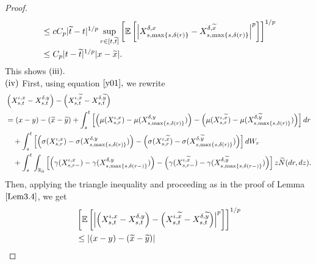 \documentclass[11pt]{article}
\theoremstyle{theorem}
\theoremstyle{definition}
\newcommand{\bR}{\mathbb{R}}
\newcommand{\1}{{\bf 1}}
\begin{document}
\begin{proof}
\begin{align*}
    & \leq c  C_p  |\widetilde{t} -t|^{1/p} \sup_{r\in [t, \widetilde{t}]} \left[ \mathbb{E} \left[\left| X_{s,\max\{s,\delta(r)\}}^{\delta,x}-X_{s,\max\{s,\delta(r)\}}^{\delta,\widetilde{x}} \right|^p \right]\right]^{1/p} \notag\\
  & \le C_p |t-\widetilde{t}|^{1/p} |x-\widetilde{x}|.
\end{align*}
This shows $\textup{(iii)}.$\\
$\textup{(iv)}$ 
First, using equation $\eqref{y01},$ we rewrite
\begin{align*}
   & \left(X^{\iota, x}_{s,t}-X^{\delta,y}_{s,t}\right) - \left(X^{\iota, \widetilde{x}}_{s,t}-X^{\delta, \widetilde{y}}_{s,t}\right) \notag\\
   & = (x-y)-(\widetilde{x}-\widetilde{y}) + \int_s^t \left[ \left(\mu(X_{s,r}^{\iota,x}) -\mu(X_{s,\max\{s,\delta(r)\}}^{\delta,y}) \right) - \left(\mu(X_{s,r}^{\iota,\widetilde{x}}) -\mu(X_{s,\max\{s,\delta(r)\}}^{\delta,\widetilde{y}}) \right)\right] dr  \notag\\
   & \quad  + \int_s^t \left[ \left(\sigma(X_{s,r}^{\iota,x}) -\sigma(X_{s,\max\{s,\delta(r)\}}^{\delta,y}) \right) - \left(\sigma(X_{s,r}^{\iota,\widetilde{x}}) -\sigma(X_{s,\max\{s,\delta(r)\}}^{\delta,\widetilde{y}}) \right)\right] dW_r  \notag\\
    & \quad + \int_s^t \int_{\bR_0} \left[ \left(\gamma(X_{s,r-}^{\iota,x}) -\gamma (X_{s,\max\{s,\delta(r-)\}}^{\delta,y}) \right) - \left(\gamma(X_{s,r-}^{\iota,\widetilde{x}}) -\gamma (X_{s,\max\{s,\delta(r-)\}}^{\delta,\widetilde{y}}) \right) \right] z \widetilde{N}(dr, dz).  
\end{align*}
Then, applying the triangle inequality and proceeding as in the proof of Lemma $\ref{Lem3.4}$, we get
\begin{align}
   &\left[\mathbb{E}\left[\left| \left(X^{\iota, x}_{s,t}-X^{\delta,y}_{s,t}\right) - \left(X^{\iota, \widetilde{x}}_{s,t}-X^{\delta, \widetilde{y}}_{s,t}\right)  
  \right|^p\right]\right]^{1/p} \notag\\
   & \le |(x-y)-(\widetilde{x}-\widetilde{y})|  \notag\\

\end{align}
\end{proof}
\end{document}
